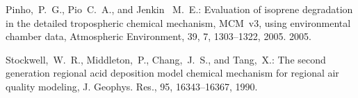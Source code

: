 \documentclass{article}
\begin{document}
\begin{thebibliography}{12}
     Pinho,~P.~G., Pio~C.~A., and Jenkin~ M.~E.: Evaluation of isoprene degradation in the detailed tropospheric chemical mechanism, MCM~v3, using environmental chamber data, Atmospheric Environment, 39, 7, 1303--1322, 2005.  2005.

     Stockwell,~W.~R., Middleton,~P., Chang,~J.~S., and Tang,~X.: {The second generation regional acid deposition model chemical mechanism for regional air quality modeling}, J. Geophys. Res., 95, 16343--16367, 1990.

\end{thebibliography}
\end{document}
